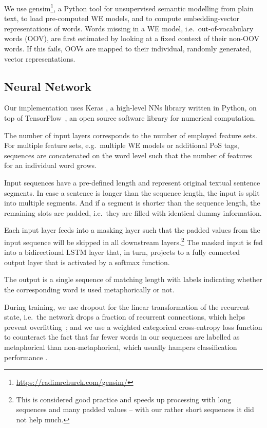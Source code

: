 \documentclass[11pt,a4paper]{article}
\begin{document}
We use gensim\footnote{\url{https://radimrehurek.com/gensim/}}, a Python tool for unsupervised semantic modelling from plain text, to load pre-computed WE models, and to compute embedding-vector representations of words.
Words missing in a WE model, i.e.~out-of-vocabulary words (OOV), are first estimated by looking at a fixed context of their non-OOV words.
If this fails, OOVs are mapped to their individual, randomly generated, vector representations.


\subsection{Neural Network} %

Our implementation uses Keras , a high-level NNs library written in Python, on top of TensorFlow~\cite{tensorflow2016}, an open source software library for numerical computation.

The number of input layers corresponds to the number of employed feature sets. 
For multiple feature sets, e.g.~multiple WE models or additional PoS tags, sequences are concatenated on the word level such that the number of features for an individual word grows.

Input sequences have a pre-defined length and represent original textual sentence segments.
In case a sentence is longer than the sequence length, the input is split into multiple segments. 
And if a segment is shorter than the sequence length, the remaining slots are padded, i.e.~they are filled with identical dummy information.

Each input layer feeds into a masking layer such that the padded values from the input sequence will be skipped in all downstream layers.\footnote{This is considered good practice and speeds up processing with long sequences and many padded values -- with our rather short sequences it did not help much.}
The masked input is fed into a bidirectional LSTM layer that, in turn, projects to a fully connected output layer that is activated by a softmax function.

The output is a single sequence of matching length with labels indicating whether the corresponding word is used metaphorically or not.

During training, we use dropout for the linear transformation of the recurrent state, i.e.~the network drops a fraction of recurrent connections, 
which helps prevent overfitting~\cite{Srivastava2014}; 
and we use a weighted categorical cross-entropy loss function to counteract the fact that far fewer words in our sequences are labelled as metaphorical than non-metaphorical, which usually hampers classification performance \cite[cf.][]{Kotsiantis2006}.
\end{document}
